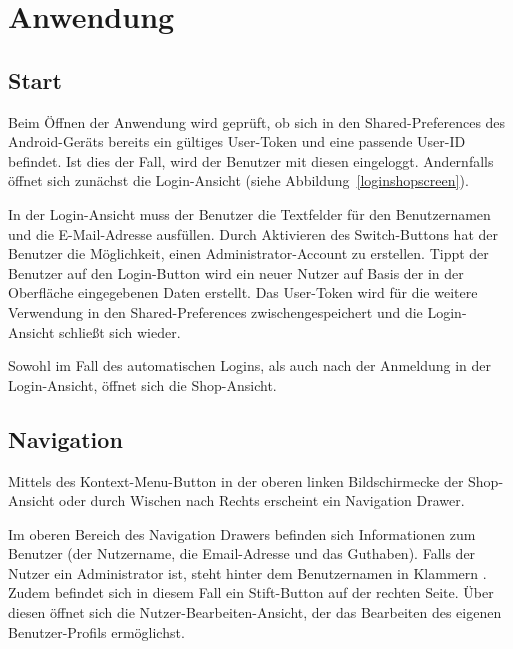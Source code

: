 \section{Anwendung}\label{sec:features}

\subsection{Start}\label{subsec:start}

Beim Öffnen der Anwendung wird geprüft, ob sich in den Shared-Preferences des Android-Geräts bereits ein gültiges User-Token und eine passende User-ID befindet.
Ist dies der Fall, wird der Benutzer mit diesen eingeloggt.
Andernfalls öffnet sich zunächst die Login-Ansicht (siehe Abbildung~\ref{loginshopscreen}).

In der Login-Ansicht muss der Benutzer die Textfelder für den Benutzernamen und die E-Mail-Adresse ausfüllen.
Durch Aktivieren des Switch-Buttons hat der Benutzer die Möglichkeit, einen Administrator-Account zu erstellen.
Tippt der Benutzer auf den Login-Button wird ein neuer Nutzer auf Basis der in der Oberfläche eingegebenen Daten erstellt.
Das User-Token wird für die weitere Verwendung in den Shared-Preferences zwischengespeichert und die Login-Ansicht schließt sich wieder.

Sowohl im Fall des automatischen Logins, als auch nach der Anmeldung in der Login-Ansicht, öffnet sich die Shop-Ansicht.


\subsection{Navigation} \label{subsec:navigation}

Mittels des Kontext-Menu-Button in der oberen linken Bildschirmecke der Shop-Ansicht oder durch Wischen nach Rechts erscheint ein Navigation Drawer.

Im oberen Bereich des Navigation Drawers befinden sich Informationen zum Benutzer (der Nutzername, die Email-Adresse und das Guthaben).
Falls der Nutzer ein Administrator ist, steht hinter dem Benutzernamen in Klammern .
Zudem befindet sich in diesem Fall ein Stift-Button auf der rechten Seite.
Über diesen öffnet sich die Nutzer-Bearbeiten-Ansicht, der das Bearbeiten des eigenen Benutzer-Profils ermöglichst.

